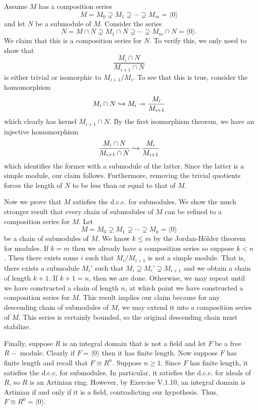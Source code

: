 \documentclass[../../master.tex]{subfiles}
\begin{document}
\begin{solution}
    Assume $M$ has a composition series
    \[
        M = M_0 \supsetneq M_1 \supsetneq \cdots \supsetneq M_m = \langle 0 \rangle
    \]
    and let $N$ be a submodule of $M$.
    Consider the series
    \[
        N = M \cap N \supsetneq M_1 \cap N \supsetneq \cdots \supsetneq M_m \cap N = \langle 0 \rangle.
    \]
    We claim that this is a composition series for $N$.
    To verify this, we only need to show that
    \[
        \frac{M_i \cap N}{M_{i+1} \cap N}
    \]
    is either trivial or isomorphic to $M_{i+1} / M_i$.
    To see that this is true, consider the homomorphism
    \[
        M_i \cap N \xhookrightarrow{} M_i \twoheadrightarrow \frac{M_i}{M_{i+1}}
    \]
    which clearly has kernel $M_{i+1} \cap N$.
    By the first isomorphism theorem, we have an injective homomorphism
    \[
        \frac{M_i \cap N}{M_{i+1} \cap N} \xhookrightarrow{} \frac{M_i}{M_{i+1}}
    \]
    which identifies the former with a submodule of the latter.
    Since the latter is a simple module, our claim follows.
    Furthermore, removing the trivial quotients forces the length of $N$ to be less than or equal to that of $M$.

    Now we prove that $M$ satisfies the d.c.c. for submodules.
    We show the much stronger result that every chain of submodules of $M$ can be refined to a composition series for $M$.
    Let
    \[
        M = M_0 \supsetneq M_1 \supsetneq \cdots \supsetneq M_k = \langle 0 \rangle
    \]
    be a chain of submodules of $M$.
    We know $k \leq m$ by the Jordan-H\"older theorem for modules.
    If $k = m$ then we already have a composition series so suppose $k < n$.
    Then there exists some $i$ such that $M_i / M_{i+1}$ is not a simple module.
    That is, there exists a submodule $M_i'$ such that $M_i \supsetneq M_i' \supsetneq M_{i+1}$ and we obtain a chain of length $k + 1$.
    If $k+1 = n$, then we are done.
    Otherwise, we may repeat until we have constructed a chain of length $n$, at which point we have constructed a composition series for $M$.
    This result implies our claim because for any descending chain of submodules of $M$, we may extend it into a composition series of $M$.
    This series is certainly bounded, so the original descending chain must stabilize.

    Finally, suppose $R$ is an integral domain that is not a field and let $F$ be a free $R-$ module.
    Clearly if $F = \langle 0 \rangle$ then it has finite length.
    Now suppose $F$ has finite length and recall that $F \cong R^{n}$.
    Suppose $n \geq 1$.
    Since $F$ has finite length, it satisfies the d.c.c. for submodules.
    In particular, it satisfies the d.c.c. for ideals of $R$, so $R$ is an Artinian ring.
    However, by Exercise V.1.10, an integral domain is Artinian if and only if it is a field, contradicting our hypothesis.
    Thus, $F \cong R^{0} = \langle 0 \rangle$.
\end{solution}
\end{document}
